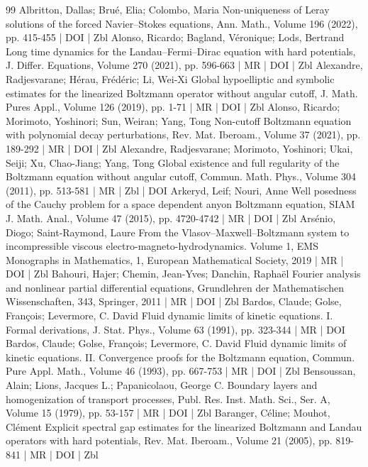 \documentclass[10pt]{amsart}
\theoremstyle{definition}\newtheorem{defi}[theo]{Definition}\newtheorem{rema}[theo]{Remark}\newtheorem{exam}[theo]{Example}\newtheorem{exem}[theo]{Example}\newtheorem{nota}[theo]{Notation}
\begin{document}
\begin{thebibliography}{99}
 Albritton, Dallas; Brué, Elia; Colombo, Maria Non-uniqueness of Leray solutions of the forced Navier–Stokes equations, Ann. Math., Volume 196 (2022), pp. 415-455 | DOI | Zbl
 Alonso, Ricardo; Bagland, Véronique; Lods, Bertrand Long time dynamics for the Landau–Fermi–Dirac equation with hard potentials, J. Differ. Equations, Volume 270 (2021), pp. 596-663 | MR | DOI | Zbl
 Alexandre, Radjesvarane; Hérau, Frédéric; Li, Wei-Xi Global hypoelliptic and symbolic estimates for the linearized Boltzmann operator without angular cutoff, J. Math. Pures Appl., Volume 126 (2019), pp. 1-71 | MR | DOI | Zbl
 Alonso, Ricardo; Morimoto, Yoshinori; Sun, Weiran; Yang, Tong Non-cutoff Boltzmann equation with polynomial decay perturbations, Rev. Mat. Iberoam., Volume 37 (2021), pp. 189-292 | MR | DOI | Zbl
 Alexandre, Radjesvarane; Morimoto, Yoshinori; Ukai, Seiji; Xu, Chao-Jiang; Yang, Tong Global existence and full regularity of the Boltzmann equation without angular cutoff, Commun. Math. Phys., Volume 304 (2011), pp. 513-581 | MR | Zbl | DOI
 Arkeryd, Leif; Nouri, Anne Well posedness of the Cauchy problem for a space dependent anyon Boltzmann equation, SIAM J. Math. Anal., Volume 47 (2015), pp. 4720-4742 | MR | DOI | Zbl
 Arsénio, Diogo; Saint-Raymond, Laure From the Vlasov–Maxwell–Boltzmann system to incompressible viscous electro-magneto-hydrodynamics. Volume 1, EMS Monographs in Mathematics, 1, European Mathematical Society, 2019 | MR | DOI | Zbl
 Bahouri, Hajer; Chemin, Jean-Yves; Danchin, Raphaël Fourier analysis and nonlinear partial differential equations, Grundlehren der Mathematischen Wissenschaften, 343, Springer, 2011 | MR | DOI | Zbl
 Bardos, Claude; Golse, François; Levermore, C. David Fluid dynamic limits of kinetic equations. I. Formal derivations, J. Stat. Phys., Volume 63 (1991), pp. 323-344 | MR | DOI
 Bardos, Claude; Golse, François; Levermore, C. David Fluid dynamic limits of kinetic equations. II. Convergence proofs for the Boltzmann equation, Commun. Pure Appl. Math., Volume 46 (1993), pp. 667-753 | MR | DOI | Zbl
 Bensoussan, Alain; Lions, Jacques L.; Papanicolaou, George C. Boundary layers and homogenization of transport processes, Publ. Res. Inst. Math. Sci., Ser. A, Volume 15 (1979), pp. 53-157 | MR | DOI | Zbl
 Baranger, Céline; Mouhot, Clément Explicit spectral gap estimates for the linearized Boltzmann and Landau operators with hard potentials, Rev. Mat. Iberoam., Volume 21 (2005), pp. 819-841 | MR | DOI | Zbl

\end{thebibliography}
\end{document}

